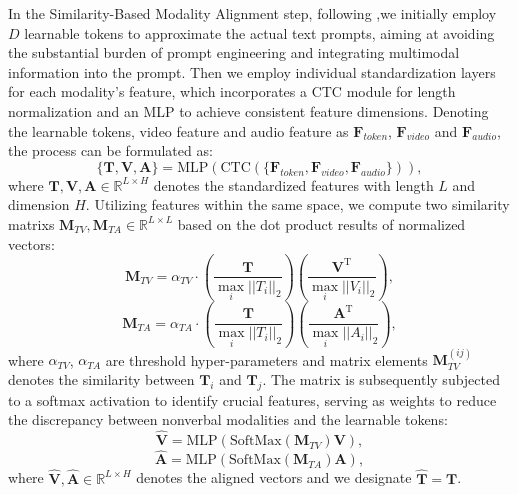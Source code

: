 \documentclass[letterpaper]{article} %
\begin{document}
In the Similarity-Based Modality Alignment step, following \cite{zhou2022conditional,rao2022denseclip,10.1145/1143844.1143891},we initially employ $D$ learnable tokens to approximate the actual text prompts, aiming at avoiding the substantial burden of prompt engineering and integrating multimodal information into the prompt. Then we employ individual standardization layers for each modality's feature, which incorporates a CTC \cite{10.1145/1143844.1143891} module for length normalization and an MLP to achieve consistent feature dimensions. Denoting the learnable tokens, video feature and audio feature as $\textbf{F}_{token}$, $\textbf{F}_{video}$ and $\textbf{F}_{audio}$, the process can be formulated as:
\begin{equation}
\{\textbf{T}, \textbf{V}, \textbf{A}\} = \text{MLP}(\text{CTC}(\{\textbf{F}_{token}, \textbf{F}_{video}, \textbf{F}_{audio}\})),
\end{equation}
where $\textbf{T}, \textbf{V}, \textbf{A} \in \mathbb{R}^{L \times H}$ denotes the standardized features with length $L$ and dimension $H$. Utilizing features within the same space, we compute two similarity matrixs $\textbf{M}_{TV}, \textbf{M}_{TA} \in \mathbb{R}^{L \times L}$ based on the dot product results of normalized vectors:
\begin{equation}
\textbf{M}_{TV} = \alpha_{TV} \cdot (\frac{\textbf{T}}{\max \limits_{i} ||T_{i}||_{2}}) (\frac{\textbf{V}^{\text{T}}}{\max \limits_{i} ||V_{i}||_{2}}),
\end{equation}
\begin{equation}
\textbf{M}_{TA} = \alpha_{TA} \cdot (\frac{\textbf{T}}{\max \limits_{i} ||T_{i}||_{2}}) (\frac{\textbf{A}^{\text{T}}}{\max \limits_{i} ||A_{i}||_{2}}),
\end{equation}
where $\alpha_{TV}$, $\alpha_{TA}$ are threshold hyper-parameters and matrix elements $\textbf{M}_{TV}^{(ij)}$ denotes the similarity between $\textbf{T}_{i}$ and $\textbf{T}_{j}$. The matrix is subsequently subjected to a softmax activation to identify crucial features, serving as weights to reduce the discrepancy between nonverbal modalities and the learnable tokens:
\begin{equation}
\hat{\textbf{V}} = \text{MLP}(\text{SoftMax}(\textbf{M}_{TV})\textbf{V}),
\end{equation}
\begin{equation}
\hat{\textbf{A}} = \text{MLP}(\text{SoftMax}(\textbf{M}_{TA})\textbf{A}),
\end{equation}
where $\hat{\textbf{V}}, \hat{\textbf{A}} \in \mathbb{R}^{L \times H}$ denotes the aligned vectors and we designate $\hat{\textbf{T}} = \textbf{T}$.
\end{document}
